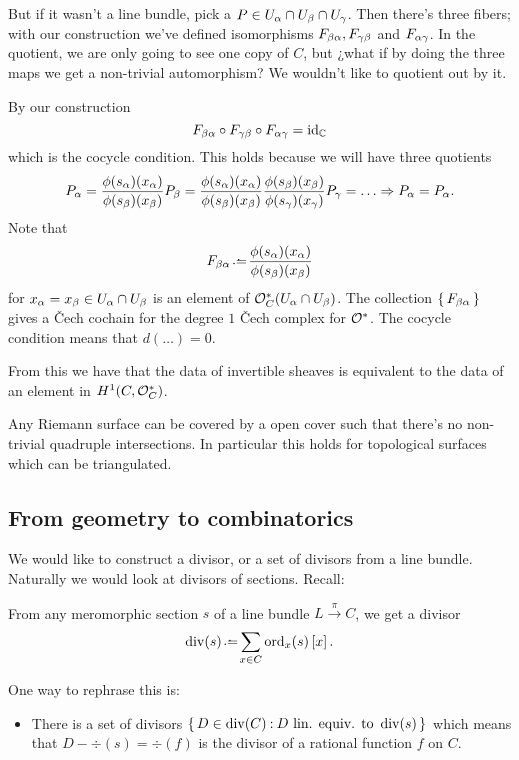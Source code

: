 \documentclass[12pt]{memoir}
\begin{document}
\begin{ptcb}
But if it wasn't a line bundle, pick a $P\in U_\alpha\cap U_\beta\cap U_\gamma$. Then there's three fibers; with our construction we've defined isomorphisms $F_{\beta\alpha},F_{\gamma\beta}$ and $F_{\alpha\gamma}$. In the quotient, we are only going to see one copy of $C$, but ¿what if by doing the three maps we get a non-trivial automorphism? We wouldn't like to quotient out by it.\par
By our construction 
$$F_{\beta\alpha}\circ F_{\gamma\beta}\circ F_{\alpha\gamma}=\operatorname{id}_{\mathbb{C}}$$
which is the cocycle condition. This holds because we will have three quotients 
$$P_\al=\frac{\phi(s_\al)(x_\al)}{\phi(s_\bt)(x_\bt)}P_\bt=\frac{\phi(s_\al)(x_\al)}{\phi(s_\bt)(x_\bt)}\frac{\phi(s_\bt)(x_\bt)}{\phi(s_\ga)(x_\ga)}P_\ga=\dots\To P_\al=P_\al.$$
    Note that 
    $$F_{\bt\al}\defeq\frac{\phi(s_\al)(x_\al)}{\phi(s_\bt)(x_\bt)}$$
    for $x_\alpha=x_\beta\in U_\alpha\cap U_\beta$ is an element of $\mathcal{O}_C^\ast(U_\alpha\cap U_\beta)$. The collection $\{\,F_{\beta\alpha}\,\}$ gives a \v{C}ech cochain for the degree $1$ \v{C}ech complex for $\mathcal{O}^\ast$. The cocycle condition means that $d(\dots)=0$.\par
    From this we have that the data of invertible sheaves is equivalent to the data of an element in $H^1(C,\mathcal{O}^\ast_C)$. 
\end{ptcb}

\begin{Ej}\label{ej-triangulable-rs}
    Any Riemann surface can be covered by a open cover such that there's no non-trivial quadruple intersections. In particular this holds for topological surfaces which can be triangulated.
\end{Ej}

\subsection{From geometry to combinatorics}

We would like to construct a divisor, or a set of divisors from a line bundle. Naturally we would look at divisors of sections. Recall:
\begin{significant}
    From any meromorphic section $s$ of a line bundle $L\xrightarrow{\pi}C$, we get a divisor
    $$\div(s)\defeq\sum_{x\in C}\ord_x(s)\bonj{x}.$$
\end{significant}
One way to rephrase this is:
\begin{itemize}
    \item There is a set of divisors $\{\,D\in\operatorname{div}(C)\mathbin{:} D\text{ lin. equiv. to }\operatorname{div}(s)\,\}$ which means that $D-\div(s)=\div(f)$ is the divisor of a rational function $f$ on $C$.
\end{itemize}
\end{document}
